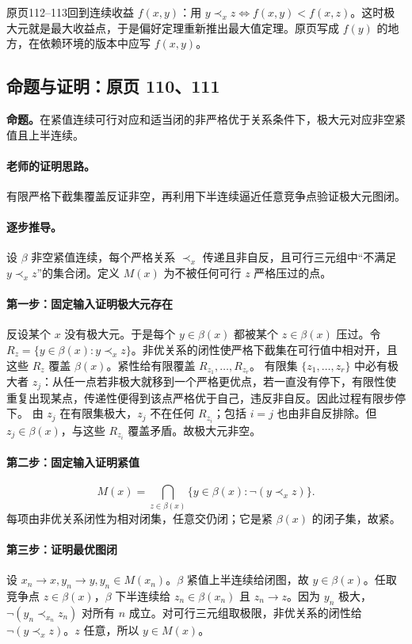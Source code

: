 \documentclass[11pt,a4paper]{article}
\theoremstyle{definition}\newtheorem{definition}{定义}\newtheorem{example}{例}
\begin{document}
原页112--113回到连续收益 $f(x,y)$：用 $y\prec_x z\iff f(x,y)<f(x,z)$。这时极大元就是最大收益点，于是偏好定理重新推出最大值定理。原页写成 $f(y)$ 的地方，在依赖环境的版本中应写 $f(x,y)$。


\subsection{命题与证明：原页 110、111}

\textbf{命题。}在紧值连续可行对应和适当闭的非严格优于关系条件下，极大元对应非空紧值且上半连续。

\paragraph{老师的证明思路。}有限严格下截集覆盖反证非空，再利用下半连续逼近任意竞争点验证极大元图闭。

\paragraph{逐步推导。}
设 $\beta$ 非空紧值连续，每个严格关系 $\prec_x$ 传递且非自反，且可行三元组中“不满足 $y\prec_x z$”的集合闭。定义 $M(x)$ 为不被任何可行 $z$ 严格压过的点。
\paragraph{第一步：固定输入证明极大元存在}
反设某个 $x$ 没有极大元。于是每个 $y\in\beta(x)$ 都被某个 $z\in\beta(x)$ 压过。令 $R_z=\{y\in\beta(x):y\prec_x z\}$。非优关系的闭性使严格下截集在可行值中相对开，且这些 $R_z$ 覆盖 $\beta(x)$。紧性给有限覆盖 $R_{z_1},\ldots,R_{z_r}$。
有限集 $\{z_1,\ldots,z_r\}$ 中必有极大者 $z_j$：从任一点若非极大就移到一个严格更优点，若一直没有停下，有限性使重复出现某点，传递性便得到该点严格优于自己，违反非自反。因此过程有限步停下。
由 $z_j$ 在有限集极大，$z_j$ 不在任何 $R_{z_i}$；包括 $i=j$ 也由非自反排除。但 $z_j\in\beta(x)$，与这些 $R_{z_i}$ 覆盖矛盾。故极大元非空。
\paragraph{第二步：固定输入证明紧值}
\[M(x)=\bigcap_{z\in\beta(x)}\{y\in\beta(x):\neg(y\prec_x z)\}.\]
每项由非优关系闭性为相对闭集，任意交仍闭；它是紧 $\beta(x)$ 的闭子集，故紧。
\paragraph{第三步：证明最优图闭}
设 $x_n\to x,y_n\to y,y_n\in M(x_n)$。$\beta$ 紧值上半连续给闭图，故 $y\in\beta(x)$。任取竞争点 $z\in\beta(x)$，$\beta$ 下半连续给 $z_n\in\beta(x_n)$ 且 $z_n\to z$。因为 $y_n$ 极大，$\neg(y_n\prec_{x_n}z_n)$ 对所有 $n$ 成立。对可行三元组取极限，非优关系的闭性给 $\neg(y\prec_x z)$。$z$ 任意，所以 $y\in M(x)$。
\end{document}
